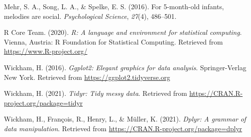 \documentclass[
  english,
  man]{apa6}
\begin{document}
\leavevmode\hypertarget{ref-mehr2016}{}%
Mehr, S. A., Song, L. A., \& Spelke, E. S. (2016). For 5-month-old infants, melodies are social. \emph{Psychological Science}, \emph{27}(4), 486--501.

\leavevmode\hypertarget{ref-R-base}{}%
R Core Team. (2020). \emph{R: A language and environment for statistical computing}. Vienna, Austria: R Foundation for Statistical Computing. Retrieved from \url{https://www.R-project.org/}

\leavevmode\hypertarget{ref-R-ggplot2}{}%
Wickham, H. (2016). \emph{Ggplot2: Elegant graphics for data analysis}. Springer-Verlag New York. Retrieved from \url{https://ggplot2.tidyverse.org}

\leavevmode\hypertarget{ref-R-tidyr}{}%
Wickham, H. (2021). \emph{Tidyr: Tidy messy data}. Retrieved from \url{https://CRAN.R-project.org/package=tidyr}

\leavevmode\hypertarget{ref-R-dplyr}{}%
Wickham, H., François, R., Henry, L., \& Müller, K. (2021). \emph{Dplyr: A grammar of data manipulation}. Retrieved from \url{https://CRAN.R-project.org/package=dplyr}

\endgroup


\clearpage
\renewcommand{\listfigurename}{Figure captions}
\end{document}
